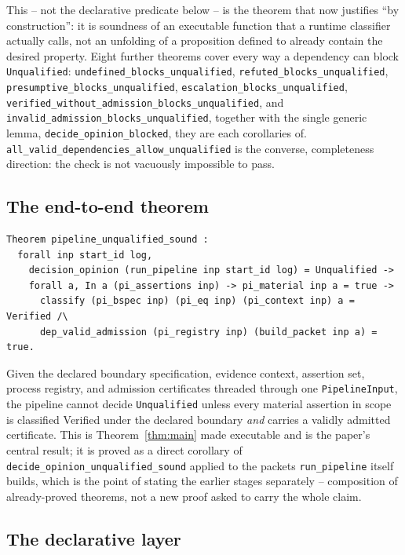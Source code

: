 \documentclass[smallcondensed,envcountsect,natbib]{svjour3}
\newcommand{\state}[1]{\textsf{#1}}
\begin{document}
This -- not the declarative predicate below -- is the theorem that now justifies ``by construction'': it is soundness of an executable function that a runtime classifier actually calls, not an unfolding of a proposition defined to already contain the desired property. Eight further theorems cover every way a dependency can block \texttt{Unqualified}: \texttt{undefined\_blocks\_unqualified}, \texttt{refuted\_blocks\_unqualified}, \texttt{presumptive\_blocks\_unqualified}, \texttt{escalation\_blocks\_unqualified}, \texttt{verified\_without\_admission\_blocks\_unqualified}, and \texttt{invalid\_admission\_blocks\_unqualified}, together with the single generic lemma, \texttt{decide\_opinion\_blocked}, they are each corollaries of. \texttt{all\_valid\_dependencies\_allow\_unqualified} is the converse, completeness direction: the check is not vacuously impossible to pass.

\subsection*{The end-to-end theorem}

\begin{lstlisting}
Theorem pipeline_unqualified_sound :
  forall inp start_id log,
    decision_opinion (run_pipeline inp start_id log) = Unqualified ->
    forall a, In a (pi_assertions inp) -> pi_material inp a = true ->
      classify (pi_bspec inp) (pi_eq inp) (pi_context inp) a = Verified /\
      dep_valid_admission (pi_registry inp) (build_packet inp a) = true.
\end{lstlisting}

Given the declared boundary specification, evidence context, assertion set, process registry, and admission certificates threaded through one \texttt{PipelineInput}, the pipeline cannot decide \texttt{Unqualified} unless every material assertion in scope is classified \state{Verified} under the declared boundary \emph{and} carries a validly admitted certificate. This is Theorem~\ref{thm:main} made executable and is the paper's central result; it is proved as a direct corollary of \texttt{decide\_opinion\_unqualified\_sound} applied to the packets \texttt{run\_pipeline} itself builds, which is the point of stating the earlier stages separately -- composition of already-proved theorems, not a new proof asked to carry the whole claim.

\subsection*{The declarative layer}
\end{document}
